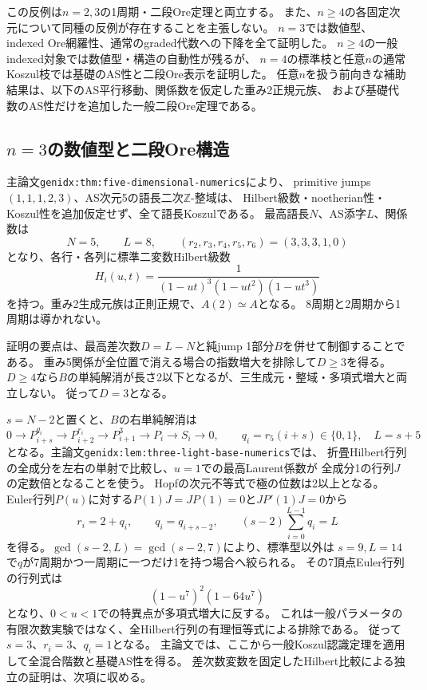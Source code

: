 \documentclass[11pt,a4paper]{ltjsarticle}
\begin{document}
この反例は$n=2,3$の1周期・二段Ore定理と両立する。
また、$n\geq4$の各固定次元について同種の反例が存在することを主張しない。
$n=3$では数値型、indexed Ore網羅性、通常のgraded代数への下降を全て証明した。
$n\geq4$の一般indexed対象では数値型・構造の自動性が残るが、
$n=4$の標準枝と任意$n$の通常Koszul枝では基礎のAS性と二段Ore表示を証明した。
任意$n$を扱う前向きな補助結果は、以下のAS平行移動、関係数を仮定した重み2正規元族、
および基礎代数のAS性だけを追加した一般二段Ore定理である。

\subsection{\texorpdfstring{$n=3$}{n=3}の数値型と二段Ore構造}
\label{note:five-dimensional-current}
主論文\texttt{genidx:thm:five-dimensional-numerics}により、
primitive jumps $(1,1,1,2,3)$、AS次元5の語長二次$\mathbb Z$-整域は、
Hilbert級数・noetherian性・Koszul性を追加仮定せず、全て語長Koszulである。
最高語長$N$、AS添字$L$、関係数は
\[
N=5,\qquad L=8,\qquad
(r_2,r_3,r_4,r_5,r_6)=(3,3,3,1,0)
\]
となり、各行・各列に標準二変数Hilbert級数
\[
H_i(u,t)=\frac1{(1-ut)^3(1-ut^2)(1-ut^3)}
\]
を持つ。重み2生成元族は正則正規で、$A(2)\simeq A$となる。
8周期と2周期から1周期は導かれない。

証明の要点は、最高差次数$D=L-N$と純jump 1部分$B$を併せて制御することである。
重み5関係が全位置で消える場合の指数増大を排除して$D\geq3$を得る。
$D\geq4$なら$B$の単純解消が長さ2以下となるが、三生成元・整域・多項式増大と両立しない。
従って$D=3$となる。

$s=N-2$と置くと、$B$の右単純解消は
\[
0\longrightarrow P_{i+s}^{q_i}\longrightarrow P_{i+2}^{r_i}
\longrightarrow P_{i+1}^{3}\longrightarrow P_i\longrightarrow S_i\longrightarrow0,
\qquad q_i=r_5(i+s)\in\{0,1\},\quad L=s+5
\]
となる。主論文\texttt{genidx:lem:three-light-base-numerics}では、
折畳Hilbert行列の全成分を左右の単射で比較し、$u=1$での最高Laurent係数が
全成分1の行列$J$の定数倍となることを使う。
Hopfの次元不等式で極の位数は2以上となる。
Euler行列$P(u)$に対する$P(1)J=JP(1)=0$と$JP'(1)J=0$から
\[
r_i=2+q_i,\qquad q_i=q_{i+s-2},\qquad
(s-2)\sum_{i=0}^{L-1}q_i=L
\]
を得る。$\gcd(s-2,L)=\gcd(s-2,7)$により、標準型以外は
$s=9,L=14$で$q$が7周期かつ一周期に一つだけ1を持つ場合へ絞られる。
その7頂点Euler行列の行列式は
\[
(1-u^7)^2(1-64u^7)
\]
となり、$0<u<1$での特異点が多項式増大に反する。
これは一般パラメータの有限次数実験ではなく、全Hilbert行列の有理恒等式による排除である。
従って$s=3$、$r_i=3$、$q_i=1$となる。
主論文では、ここから一般Koszul認識定理を適用して全混合階数と基礎AS性を得る。
差次数変数を固定したHilbert比較による独立の証明は、次項に収める。
\end{document}
